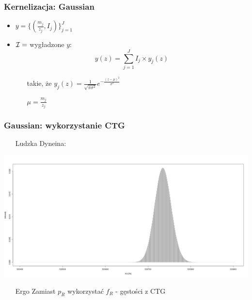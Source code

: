 \documentclass[xetex]{beamer}
\begin{document}
	
	\begin{frame}\frametitle{Kernelizacja: Gaussian}

		\begin{itemize}
			\item $y = \Big\{ (\frac{m_j}{z_j}, I_j) \Big\}_{j = 1}^{J}$
			\item $\mathcal{I} = $ wygładzone $y$:
				$$ y(z) = \sum_{j=1}^J I_j \times y_j (z)$$
			\begin{itemize}
			 	\item[takie, że]$y_j (z) = \frac{1}{\sqrt{\pi \sigma^2}} e^{-\frac{(z-\mu)^2}{\sigma^2}}$ 
			 	\item[]$\mu = \frac{m_j}{z_j}$
			\end{itemize} 
		\end{itemize}
	\end{frame}


	\begin{frame}\frametitle{Gaussian: wykorzystanie CTG}

		\begin{itemize}
			\item[] Ludzka Dyneina: 			
		\end{itemize}

		\begin{center}
			\includegraphics[width=.8\textwidth, keepaspectratio]{./picts/humanDynein.png}
		\end{center}

		\begin{itemize}
			\item[Ergo] Zamiast $p_R$ wykorzystać $f_R$ - gęstości z CTG
		\end{itemize}
	\end{frame}
\end{document}
